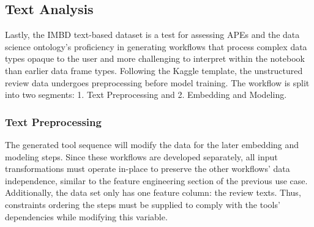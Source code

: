 \subsection{Text Analysis}

Lastly, the IMBD text-based dataset is a test for assessing APEs and the data science ontology's proficiency in generating workflows that process complex data types opaque to the user and more challenging to interpret within the notebook than earlier data frame types. Following the Kaggle template, the unstructured review data undergoes preprocessing before model training. The workflow is split into two segments: 1. Text Preprocessing and 2. Embedding and Modeling.

\subsubsection{Text Preprocessing}

The generated tool sequence will modify the data for the later embedding and modeling steps. Since these workflows are developed separately, all input transformations must operate in-place to preserve the other workflows' data independence, similar to the feature engineering section of the previous use case. Additionally, the data set only has one feature column: the review texts. Thus, constraints ordering the steps must be supplied to comply with the tools' dependencies while modifying this variable.

